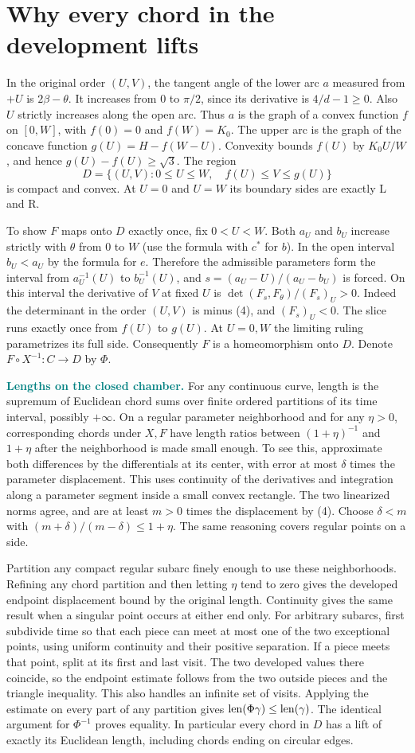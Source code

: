 \documentclass[11pt,letterpaper]{article}
\newcommand{\heading}[1]{\section*{\color{ink}#1}}
\newcommand{\para}[1]{\smallskip\noindent\textcolor{teal}{\textbf{#1}}\enspace}
\newcommand{\len}{\mathop{\rm len}}
\newcommand{\rt}{\sqrt{3}}
\begin{document}
\newpage
\heading{Why every chord in the development lifts}
In the original order $(U,V)$, the tangent angle of the lower arc $a$ measured from $+U$ is $2\beta-\theta$. It increases from $0$ to $\pi/2$, since its derivative is $4/d-1\ge0$. Also $U$ strictly increases along the open arc. Thus $a$ is the graph of a convex function $f$ on $[0,W]$, with $f(0)=0$ and $f(W)=K_0$. The upper arc is the graph of the concave function $g(U)=H-f(W-U)$. Convexity bounds $f(U)$ by $K_0U/W$, and hence $g(U)-f(U)\ge\rt$. The region
\[
 D=\{(U,V):0\le U\le W,\quad f(U)\le V\le g(U)\}
\]
is compact and convex. At $U=0$ and $U=W$ its boundary sides are exactly L and R.

To show $F$ maps onto $D$ exactly once, fix $0<U<W$. Both $a_U$ and $b_U$ increase strictly with $\theta$ from $0$ to $W$ (use the formula with $c^*$ for $b$). In the open interval $b_U<a_U$ by the formula for $e$. Therefore the admissible parameters form the interval from $a_U^{-1}(U)$ to $b_U^{-1}(U)$, and $s=(a_U-U)/(a_U-b_U)$ is forced. On this interval the derivative of $V$ at fixed $U$ is $\det(F_s,F_\theta)/(F_s)_U>0$. Indeed the determinant in the order $(U,V)$ is minus (4), and $(F_s)_U<0$. The slice runs exactly once from $f(U)$ to $g(U)$. At $U=0,W$ the limiting ruling parametrizes its full side. Consequently $F$ is a homeomorphism onto $D$. Denote $F\circ X^{-1}:C\to D$ by $\Phi$.

\para{Lengths on the closed chamber.} For any continuous curve, length is the supremum of Euclidean chord sums over finite ordered partitions of its time interval, possibly $+\infty$. On a regular parameter neighborhood and for any $\eta>0$, corresponding chords under $X,F$ have length ratios between $(1+\eta)^{-1}$ and $1+\eta$ after the neighborhood is made small enough. To see this, approximate both differences by the differentials at its center, with error at most $\delta$ times the parameter displacement. This uses continuity of the derivatives and integration along a parameter segment inside a small convex rectangle. The two linearized norms agree, and are at least $m>0$ times the displacement by (4). Choose $\delta<m$ with $(m+\delta)/(m-\delta)\le1+\eta$. The same reasoning covers regular points on a side.

Partition any compact regular subarc finely enough to use these neighborhoods. Refining any chord partition and then letting $\eta$ tend to zero gives the developed endpoint displacement bound by the original length. Continuity gives the same result when a singular point occurs at either end only. For arbitrary subarcs, first subdivide time so that each piece can meet at most one of the two exceptional points, using uniform continuity and their positive separation. If a piece meets that point, split at its first and last visit. The two developed values there coincide, so the endpoint estimate follows from the two outside pieces and the triangle inequality. This also handles an infinite set of visits. Applying the estimate on every part of any partition gives $\len(\Phi\gamma)\le\len(\gamma)$. The identical argument for $\Phi^{-1}$ proves equality. In particular every chord in $D$ has a lift of exactly its Euclidean length, including chords ending on circular edges.
\end{document}
